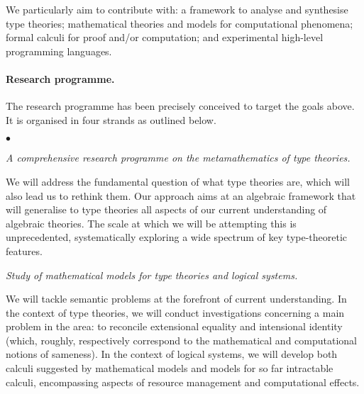 \documentclass[11pt,twocolumn]{article}
\newenvironment{myitemize}
  {\begin{list}{$\bullet$}
  {\setlength{\topsep}{1pt}
   \setlength{\partopsep}{1pt}
   \setlength{\itemsep}{0pt}
   \setlength{\parsep}{0pt}
   \setlength{\leftmargin}{1em}
   \setlength{\labelwidth}{.5em}}}
  {\end{list}}
\begin{document}
We particularly aim to contribute with: a framework to analyse and synthesise
type theories; mathematical theories and models for computational phenomena;
formal calculi for proof and/or computation; and experimental high-level
programming languages.

\paragraph{Research programme.}

The research programme has been precisely conceived to target the goals
above.  It is organised in four strands as outlined below.
\begin{myitemize}
\item[{\bfseries 1\enspace Foundations:}]\mbox{}\enspace\thinspace 
  \emph{A comprehensive research programme on the metamathematics of type
    theories.}

  \vspace*{1mm}
  We will address the fundamental question of what type theories are,
  which will also lead us to rethink them.  
  Our approach 
  aims at an algebraic framework that will generalise to type theories all
  aspects of our current understanding of algebraic
  theories. %
  The scale at which we will be attempting this is unprecedented,
  systematically exploring a wide spectrum of key type-theoretic features.
  \vspace*{1mm}

\item[{\bfseries 2\enspace Models:}]\mbox{}\enspace\thinspace
  \emph{Study of mathematical models for type theories and logical systems.}

  \vspace*{1mm}
  We will tackle semantic problems at the forefront of current understanding.
  In the context of type theories, we will conduct investigations
  concerning a main problem in the area: to reconcile extensional equality
  and intensional identity (which, roughly, respectively correspond to the
  mathematical and computational notions of sameness).  
  In the context of logical systems, we will develop both %
  calculi suggested by mathematical models and %
  models for so far intractable calculi, encompassing aspects of resource
  management and computational effects.  
  \vspace*{-3mm}%
  

\end{myitemize}
\end{document}
